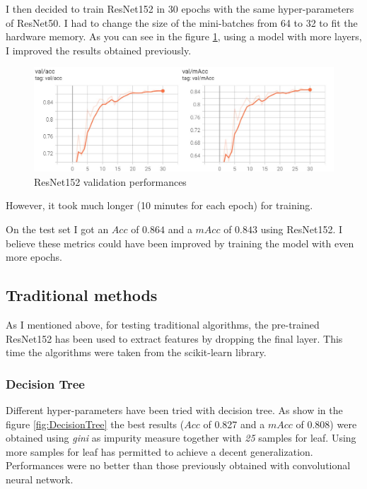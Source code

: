 \documentclass[10pt,twocolumn,letterpaper]{article}
\begin{document}
I then decided to train ResNet152 in 30 epochs with the same hyper-parameters of ResNet50. I had to change the size of the mini-batches from 64 to 32 to fit the hardware memory. As you can see in the figure \ref{fig:resNet152}, using a model with more layers, I improved the results obtained previously.

\begin{figure}[h]
\includegraphics[width=\linewidth]{resnet152-val-acc}
\caption{ResNet152 validation performances}
\label{fig:resNet152}
\end{figure}

\noindent
However, it took much longer (10 minutes for each epoch) for training. 

On the test set I got an $Acc$ of $0.864$ and a $mAcc$ of $0.843$ using ResNet152. I believe these metrics could have been improved by training the model with even more epochs. 

\subsection{Traditional methods}

As I mentioned above, for testing traditional algorithms, the pre-trained ResNet152 has been used to extract features by dropping the final layer. This time the algorithms were taken from the scikit-learn library\cite{scikit-learn-sv-learning}.

\subsubsection{Decision Tree}

Different hyper-parameters have been tried with decision tree.
As show in the figure \ref{fig:DecisionTree} the best results ($Acc$ of 0.827 and a $mAcc$ of 0.808) were obtained using \textit{gini} as impurity measure together with \textit{25} samples for leaf. Using more samples for leaf has permitted to achieve a decent generalization. Performances were no better than those previously obtained with convolutional neural network.
\end{document}
